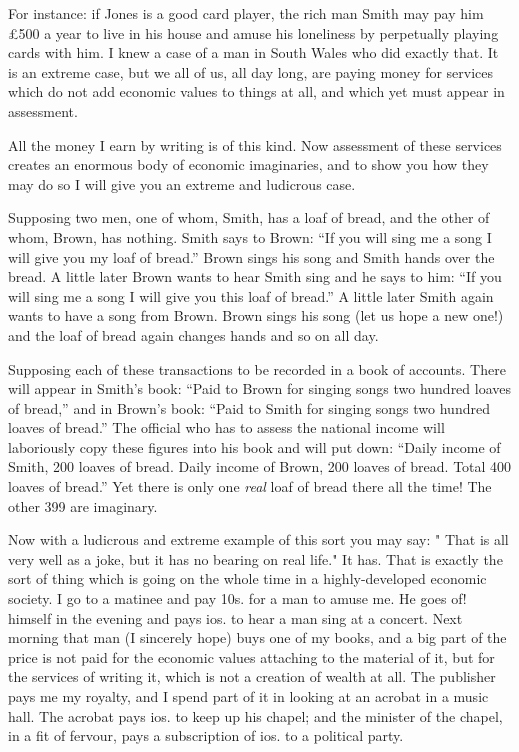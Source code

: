 \documentclass{book}
\begin{document}
For instance: if Jones is a good card player, the rich man Smith may pay him £500 a year to live in his house and amuse his loneliness by perpetually playing cards with him. I knew a case of a man in South Wales who did exactly that. It is an extreme case, but we all of us, all day long, are paying money for services which do not add economic values to things at all, and which yet must appear in assessment.

All the money I earn by writing is of this kind. Now assessment of these services creates an enormous body of economic imaginaries, and to show you how they may do so I will give you an extreme and ludicrous case.

Supposing two men, one of whom, Smith, has a loaf of bread, and the other of whom, Brown, has nothing. Smith says to Brown: “If you will sing me a song I will give you my loaf of bread.” Brown sings his song and Smith hands over the bread. A little later Brown wants to hear Smith sing and he says to him: “If you will sing me a song I will give you this loaf of bread.” A little later Smith again wants to have a song from Brown. Brown sings his song (let us hope a new one!) and the loaf of bread again changes hands and so on all day.

Supposing each of these transactions to be recorded in a book of accounts. There will appear in Smith’s book: “Paid to Brown for singing songs two hundred loaves of bread,” and in Brown’s book: “Paid to Smith for singing songs two hundred loaves of bread.” The official who has to assess the national income will laboriously copy these figures into his book and will put down: “Daily income of Smith, 200 loaves of bread. Daily income of Brown, 200 loaves of bread. Total 400 loaves of bread.” Yet there is only one \emph{real} loaf of bread there all the time! The other 399 are imaginary.

Now with a ludicrous and extreme example of this sort you may say: " That is all very well as a joke, but it has no bearing on real life." It has. That is exactly the sort of thing which is going on the whole time in a highly-developed economic society. I go to a matinee and pay 10s. for a man to amuse me. He goes of! himself in the evening and pays ios. to hear a man sing at a concert. Next morning that man (I sincerely hope) buys one of my books, and a big part of the price is not paid for the economic values attaching to the material of it, but for the services of writing it, which is not a creation of wealth at all. The publisher pays me my royalty, and I spend part of it in looking at an acrobat in a music hall. The acrobat pays ios. to keep up his chapel; and the minister of the chapel, in a fit of fervour, pays a subscription of ios. to a political party.
\end{document}
